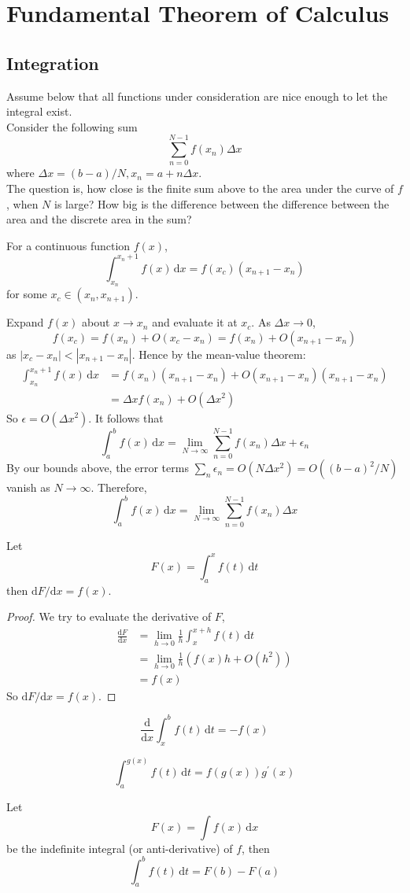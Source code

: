 \section{Fundamental Theorem of Calculus}
\subsection{Integration}
Assume below that all functions under consideration are nice enough to let the integral exist.\\
Consider the following sum
$$\sum_{n=0}^{N-1}f(x_n)\Delta x$$
where $\Delta x=(b-a)/N, x_n=a+n\Delta x$.\\
The question is, how close is the finite sum above to the area under the curve of $f$, when $N$ is large?
How big is the difference between the difference between the area and the discrete area in the sum?
\begin{theorem}
    For a continuous function $f(x)$,
    $$\int_{x_n}^{x_n+1}f(x)\,\mathrm dx=f(x_c)(x_{n+1}-x_n)$$
    for some $x_c\in(x_n,x_{n+1})$.
\end{theorem}
Expand $f(x)$ about $x\to x_n$ and evaluate it at $x_c$.
As $\Delta x\to 0$,
$$f(x_c)=f(x_n)+O(x_c-x_n)=f(x_n)+O(x_{n+1}-x_n)$$
as $|x_c-x_n|<|x_{n+1}-x_n|$.
Hence by the mean-value theorem:
\begin{align*}
    \int_{x_n}^{x_n+1}f(x)\,\mathrm dx
    &=f(x_n)(x_{n+1}-x_n)+O(x_{n+1}-x_n)(x_{n+1}-x_n)\\
    &=\Delta xf(x_n)+O(\Delta x^2)
\end{align*}
So $\epsilon=O(\Delta x^2)$.
It follows that
$$\int_a^bf(x)\,\mathrm dx=\lim_{N\to\infty}\sum_{n=0}^{N-1}f(x_n)\Delta x+\epsilon_n$$
By our bounds above, the error terms $\sum_n\epsilon_n=O(N\Delta x^2)=O((b-a)^2/N)$ vanish as $N\to\infty$.
Therefore,
$$\int_a^bf(x)\,\mathrm dx=\lim_{N\to\infty}\sum_{n=0}^{N-1}f(x_n)\Delta x$$
\begin{theorem}
    Let
    $$F(x)=\int_a^xf(t)\,\mathrm dt$$
    then $\mathrm dF/\mathrm dx=f(x)$.
\end{theorem}
\begin{proof}
    We try to evaluate the derivative of $F$,
    \begin{align*}
        \frac{\mathrm dF}{\mathrm dx}
        &=\lim_{h\to0}\frac{1}{h}\int_{x}^{x+h}f(t)\,\mathrm dt\\
        &=\lim_{h\to0}\frac{1}{h}(f(x)h+O(h^2))\\
        &=f(x)
    \end{align*}
    So $\mathrm dF/\mathrm dx=f(x)$.
\end{proof}
\begin{corollary}
    $$\frac{\mathrm d}{\mathrm dx}\int_x^bf(t)\,\mathrm dt=-f(x)$$
\end{corollary}
\begin{corollary}
    $$\int_a^{g(x)}f(t)\,\mathrm dt=f(g(x))g^\prime(x)$$
\end{corollary}
\begin{corollary}
    Let
    $$F(x)=\int f(x)\,\mathrm dx$$
    be the indefinite integral (or anti-derivative) of $f$, then
    $$\int_a^bf(t)\,\mathrm dt=F(b)-F(a)$$
\end{corollary}
